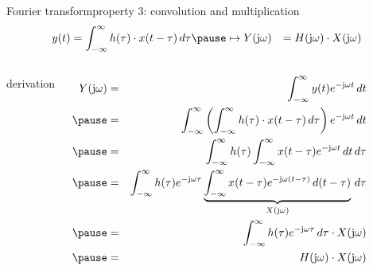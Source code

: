 	\begin{frame}{Fourier transform}{property 3: convolution and multiplication}
		\vspace{-7mm}
        \begin{eqnarray*}
			y(t) &= \int_{-\infty}^{\infty} {h(\tau) \cdot x(t-\tau)\, d\tau}\pause\mapsto 
			Y(\jom) &= H(\jom)\cdot X(\jom) \nonumber
		\end{eqnarray*}
		\pause
        \begin{columns}
            derivation
        \vspace{-5mm}
					\begin{footnotesize}
				\begin{eqnarray*}
					Y(\jom)	&=& \int_{-\infty}^{\infty} {y(t) \e^{-\jom t}\, dt}\nonumber\\
							\pause
								&=& \int_{-\infty}^{\infty} {\left(\int_{-\infty}^{\infty} {h(\tau) \cdot x(t-\tau)\, d\tau}\right) \e^{-\jom t}\, dt}\nonumber\\
							\pause
								&=& \int_{-\infty}^{\infty} {h(\tau) \int_{-\infty}^{\infty} {x(t-\tau)} \e^{-\jom t}\, dt\, d\tau}\nonumber\\
							\pause
								&=& \int_{-\infty}^{\infty} {h(\tau)  \e^{-\jom \tau} \underbrace{\int_{-\infty}^{\infty} {x(t-\tau)} \e^{-\jom (t-\tau)}\, d(t-\tau)}_{X(\jom)}\, d\tau}\nonumber\\
							\pause
								&=& \int_{-\infty}^{\infty} {h(\tau) \e^{-\jom \tau}\, d\tau} \cdot X(\jom)\nonumber\\
							\pause
								&=& H(\jom) \cdot X(\jom)\label{eq:mult_conv} 
				\end{eqnarray*}
					\end{footnotesize}
        \end{columns}
	\end{frame}	

